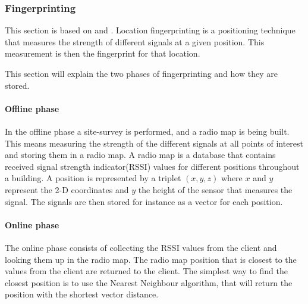 \subsubsection{Fingerprinting}\label{fingerprinting}
This section is based on \citet{fingerprinting_slides} and \citet{fingerprinting}.
Location fingerprinting is a positioning technique that measures the strength of different signals at a given position.
This measurement is then the fingerprint for that location.

This section will explain the two phases of fingerprinting and how they are stored.
\paragraph{Offline phase}
In the offline phase a site-survey is performed, and a radio map is being built.
This means measuring the strength of the different signals at all points of interest and storing them in a radio map.
A radio map is a database that contains received signal strength indicator(RSSI) values for different positions throughout a building.
A position is represented by a triplet $(x,y,z)$ where $x$ and $y$ represent the 2-D coordinates and $y$ the height of the sensor that measures the signal.
The signals are then stored for instance as a vector for each position.

\paragraph{Online phase}
The online phase consists of collecting the RSSI values from the client and looking them up in the radio map.
The radio map position that is closest to the values from the client are returned to the client.
The simplest way to find the closest position is to use the Nearest Neighbour algorithm, that will return the position with the shortest vector distance.
